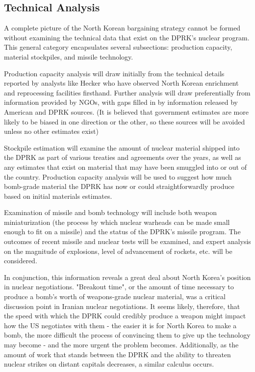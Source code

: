 \documentclass{article}
\begin{document}
\subsection{Technical Analysis}

A complete picture of the North Korean bargaining strategy cannot be formed without examining the technical data that exist on the DPRK's nuclear program. This general category encapsulates several subsections: production capacity, material stockpiles, and missile technology.

Production capacity analysis will draw initially from the technical details reported by analysts like Hecker\cite{hecker} who have observed North Korean enrichment and reprocessing facilities firsthand. Further analysis will draw preferentially from information provided by NGOs, with gaps filled in by information released by American and DPRK sources. (It is believed that government estimates are more likely to be biased in one direction or the other, so these sources will be avoided unless no other estimates exist)

Stockpile estimation will examine the amount of nuclear material shipped into the DPRK as part of various treaties and agreements over the years, as well as any estimates that exist on material that may have been smuggled into or out of the country. Production capacity analysis will be used to suggest how much bomb-grade material the DPRK has now or could straightforwardly produce based on initial materials estimates.

Examination of missile and bomb technology will include both weapon miniaturization (the process by which nuclear warheads can be made small enough to fit on a missile) and the status of the DPRK's missile program. The outcomes of recent missile and nuclear tests will be examined, and expert analysis on the magnitude of explosions, level of advancement of rockets, etc. will be considered. 

In conjunction, this information reveals a great deal about North Korea's position in nuclear negotiations. "Breakout time", or the amount of time necessary to produce a bomb's worth of weapons-grade nuclear material, was a critical discussion point in Iranian nuclear negotiations. It seems likely, therefore, that the speed with which the DPRK could credibly produce a weapon might impact how the US negotiates with them - the easier it is for North Korea to make a bomb, the more difficult the process of convincing them to give up the technology may become - and the more urgent the problem becomes. Additionally, as the amount of work that stands between the DPRK and the ability to threaten nuclear strikes on distant capitals decreases, a similar calculus occurs.
\end{document}
